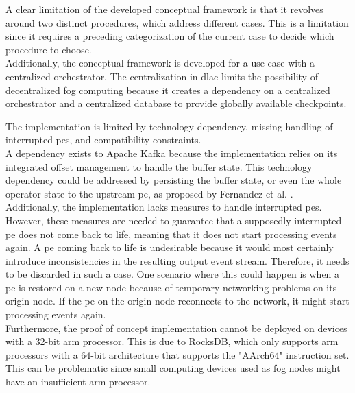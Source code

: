 A clear limitation of the developed conceptual framework is that it revolves around two distinct procedures, which address different cases. This is a limitation since it requires a preceding categorization of the current case to decide which procedure to choose.\\
Additionally, the conceptual framework is developed for a use case with a centralized orchestrator. The centralization in \gls{dlac} limits the possibility of decentralized fog computing because it creates a dependency on a centralized orchestrator and a centralized database to provide globally available checkpoints.\par

The implementation is limited by technology dependency, missing handling of interrupted \gls{pe}s, and compatibility constraints.\\
A dependency exists to Apache Kafka because the implementation relies on its integrated offset management to handle the buffer state. This technology dependency could be addressed by persisting the buffer state, or even the whole operator state to the upstream \gls{pe}, as proposed by Fernandez et al. \cite{CastroFernandez.2013}.\\
Additionally, the implementation lacks measures to handle interrupted \gls{pe}s. However, these measures are needed to guarantee that a supposedly interrupted \gls{pe} does not come back to life, meaning that it does not start processing events again. A \gls{pe} coming back to life is undesirable because it would most certainly introduce inconsistencies in the resulting output event stream. Therefore, it needs to be discarded in such a case. One scenario where this could happen is when a \gls{pe} is restored on a new node because of temporary networking problems on its origin node. If the \gls{pe} on the origin node reconnects to the network, it might start processing events again.\\
Furthermore, the proof of concept implementation cannot be deployed on devices with a 32-bit arm processor. This is due to RocksDB, which only supports arm processors with a 64-bit architecture that supports the "AArch64" instruction set. This can be problematic since small computing devices used as fog nodes might have an insufficient arm processor.\par

